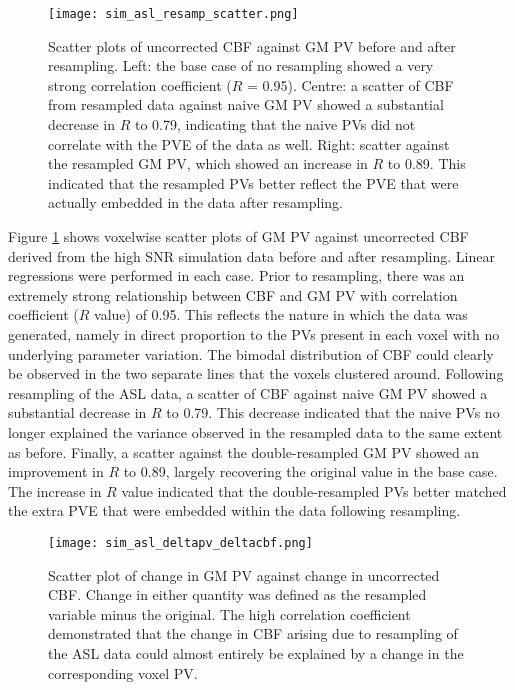 \begin{figure}[H]
\centering
\texttt{[image: sim\_asl\_resamp\_scatter.png]}
\caption{Scatter plots of uncorrected CBF against GM PV before and after resampling. Left: the base case of no resampling showed a very strong correlation coefficient ($R$ = 0.95). Centre: a scatter of CBF from resampled data against naive GM PV showed a substantial decrease in $R$ to 0.79, indicating that the naive PVs did not correlate with the PVE of the data as well. Right: scatter against the resampled GM PV, which showed an increase in $R$ to 0.89. This indicated that the resampled PVs better reflect the PVE that were actually embedded in the data after resampling.}
\label{sim_asl_resamp_scatter}
\end{figure}

Figure \ref{sim_asl_resamp_scatter} shows voxelwise scatter plots of GM PV against uncorrected CBF derived from the high SNR simulation data before and after resampling. Linear regressions were performed in each case. Prior to resampling, there was an extremely strong relationship between CBF and GM PV with correlation coefficient ($R$ value) of 0.95. This reflects the nature in which the data was generated, namely in direct proportion to the PVs present in each voxel with no underlying parameter variation. The bimodal distribution of CBF could clearly be observed in the two separate lines that the voxels clustered around. Following resampling of the ASL data, a scatter of CBF against naive GM PV showed a substantial decrease in $R$ to 0.79. This decrease indicated that the naive PVs no longer explained the variance observed in the resampled data to the same extent as before. Finally, a scatter against the double-resampled GM PV showed an improvement in $R$ to 0.89, 
largely recovering the original value in the base case. The increase in $R$ value indicated that the double-resampled PVs better matched the extra PVE that were embedded within the data following resampling. 

\begin{figure}[H]
\centering
\texttt{[image: sim\_asl\_deltapv\_deltacbf.png]}
\caption{Scatter plot of change in GM PV against change in uncorrected CBF. Change in either quantity was defined as the resampled variable minus the original. The high correlation coefficient demonstrated that the change in CBF arising due to resampling of the ASL data could almost entirely be explained by a change in the corresponding voxel PV.}
\label{sim_asl_deltapv_deltacbf}
\end{figure}

